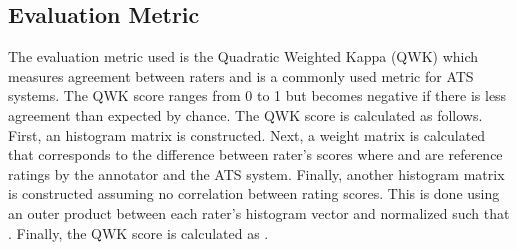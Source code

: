 \documentclass[letterpaper]{article}
\begin{document}
\subsection{Evaluation Metric}
 The evaluation metric used is the Quadratic Weighted Kappa (QWK) which measures agreement between raters and is a commonly used metric for ATS systems. The QWK score ranges from 0 to 1 but becomes negative if there is less agreement than expected by chance. The QWK score is calculated as follows. First, an  histogram matrix  is constructed. Next, a weight matrix  is calculated that corresponds to the difference between rater's scores where  and  are reference ratings by the annotator and the ATS system. Finally, another  histogram matrix  is constructed assuming no correlation between rating scores. This is done using an outer product between each rater's histogram vector and normalized such that . Finally, the QWK score is calculated as . 
\end{document}
